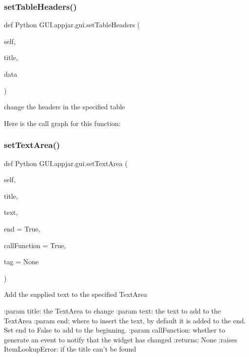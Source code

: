 \begin{DoxyVerb}
\subsubsection{\texorpdfstring{set\+Table\+Headers()}{setTableHeaders()}}
{\footnotesize\ttfamily def Python G\+U\+I.\+appjar.\+gui.\+set\+Table\+Headers (\begin{DoxyParamCaption}\item[{}]{self,  }\item[{}]{title,  }\item[{}]{data }\end{DoxyParamCaption})}

\begin{DoxyVerb}change the headers in the specified table \end{DoxyVerb}
 Here is the call graph for this function\+:
\mbox{\label{class_python_01_g_u_i_1_1appjar_1_1gui_a55584b1e094306acb04bea1c45acf414}} 
\subsubsection{\texorpdfstring{set\+Text\+Area()}{setTextArea()}}
{\footnotesize\ttfamily def Python G\+U\+I.\+appjar.\+gui.\+set\+Text\+Area (\begin{DoxyParamCaption}\item[{}]{self,  }\item[{}]{title,  }\item[{}]{text,  }\item[{}]{end = {\ttfamily True},  }\item[{}]{call\+Function = {\ttfamily True},  }\item[{}]{tag = {\ttfamily None} }\end{DoxyParamCaption})}

\begin{DoxyVerb}Add the supplied text to the specified TextArea

:param title: the TextArea to change
:param text: the text to add to the TextArea
:param end: where to insert the text, by default it is added to the end. Set end to False to add to the beginning.
:param callFunction: whether to generate an event to notify that the widget has changed
:returns: None
:raises ItemLookupError: if the title can't be found
\end{DoxyVerb}
 \mbox{\label{class_python_01_g_u_i_1_1appjar_1_1gui_a4eb9ac92c49c04cca555f15837623aa4}} 

\end{DoxyVerb}
